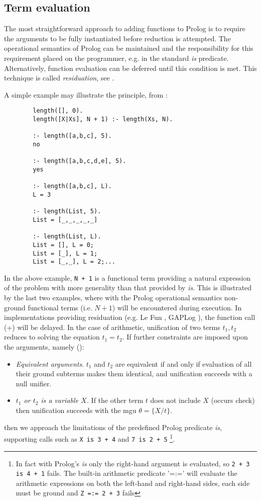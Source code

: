 \subsection{Term evaluation}

The most straightforward approach to adding functions to Prolog is to require the arguments
to be fully instantiated before reduction is attempted.  The operational semantics of Prolog
can be maintained and the responsibility for this requirement placed on the programmer, e.g. in
the standard \textit{is} predicate.  Alternatively,
function evaluation can be deferred until this condition is met.
This technique is called \textit{residuation}, see \cite{AKLN87}.

A simple example may illustrate the principle, from \cite{MBB+93}:

\noindent
\begin{verbatim}
		length([], 0).
		length([X|Xs], N + 1) :- length(Xs, N).

		:- length([a,b,c], 5).
		no

		:- length([a,b,c,d,e], 5).
		yes

		:- length([a,b,c], L).
		L = 3

		:- length(List, 5).
		List = [_,_,_,_,_]

		:- length(List, L).
		List = [], L = 0;
		List = [_], L = 1;
		List = [_,_], L = 2;...
\end{verbatim}

In the above example, \texttt{N + 1} is a functional term providing a natural expression
of the problem with more generality than that provided by \textit{is}.
This is illustrated by the last two examples, where with the Prolog operational semantics
non-ground functional terms (i.e. $N + 1$) will be encountered during execution.  In implementations
providing residuation (e.g. Le Fun \cite{AKLN87}, GAPLog \cite{MBB+93}),
the function call (+) will be delayed.  In the case of arithmetic, unification of 
two terms $t_1, t_2$ reduces to solving the equation $t_1 = t_2$. If further constraints are
imposed upon the arguments, namely (\cite{MBB+93}):
\begin{itemize}
\item{\textit{Equivalent arguments}. $t_1$ and $t_2$ are equivalent if and only if evaluation of
  all their ground subterms makes them identical, and unification succeeds with a null unifier.}
\item{\textit{$t_1$ or $t_2$ is a variable $X$.}  If the other term $t$ does not include $X$ (occurs
  check) then unification succeeds with the mgu $\theta = \{X/t\}$.}
\end{itemize}
then we approach the limitations of the predefined Prolog predicate \textit{is},
supporting calls such as
\texttt{X is 3 + 4} and \texttt{7 is 2 + 5}
\footnote{In fact with Prolog's \textit{is} 
  only the right-hand argument is evaluated, so \texttt{2 + 3 is 4 + 1} fails.
  The built-in arithmetic predicate '=:=' will evaluate the arithmetic 
  expressions on both the left-hand and right-hand sides, each side
  must be ground and \texttt{Z =:= 2 + 3} fails}.

